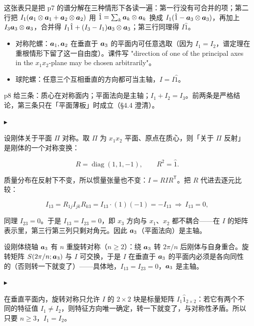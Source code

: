 \documentclass[11pt]{ctexart}
\newcommand{\step}[1]{\par\vspace{3pt}\noindent
  {\color{violet}\small$\blacktriangleright$}\hspace{3pt}{\bfseries\color{violetdeep}#1}\par\vspace{1pt}}
\begin{document}
这张表只是把 p7 的谱分解在三种情形下各读一遍：第一行没有可合并的项；第二行把 $I_1(\boldsymbol{a}_1\otimes\boldsymbol{a}_1+\boldsymbol{a}_2\otimes\boldsymbol{a}_2)$ 用 $\hat1=\sum_k\boldsymbol{a}_k\otimes\boldsymbol{a}_k$ 换成 $I_1(\hat1-\boldsymbol{a}_3\otimes\boldsymbol{a}_3)$，再加上 $I_3\boldsymbol{a}_3\otimes\boldsymbol{a}_3$，合并得 $I_1\hat1+(I_3-I_1)\boldsymbol{a}_3\otimes\boldsymbol{a}_3$；第三行同理得 $I\hat1$。

\begin{itemize}
\item 对称陀螺：$\boldsymbol{a}_1,\boldsymbol{a}_2$ 在垂直于 $\boldsymbol{a}_3$ 的平面内可任意选取（因为 $I_1=I_2$，谱定理在重根情形下留了这一自由度）。课件写 "direction of one of the principal axes in the $x_1x_2$-plane may be chosen arbitrarily"。
\item 球陀螺：任意三个互相垂直的方向都可当主轴，$I=I\hat1$。
\end{itemize}


p8 给三条：质心在对称面内；平面法向是主轴；$I_1+I_2=I_3$。前两条是严格结论，第三条只在「平面薄板」时成立（\S4.4 澄清）。

\step{证明：法向是主轴}
设刚体关于平面 $\Pi$ 对称。取 $\Pi$ 为 $x_1x_2$ 平面、原点在质心，则「关于 $\Pi$ 反射」是刚体的一个对称变换：

\[
R=\operatorname{diag}(1,1,-1),\qquad R^2=\hat1 .
\]

质量分布在反射下不变，所以惯量张量也不变：$I=RI R^{\mathsf T}$。把 $R$ 代进去逐元比较：

\[
I_{13}=R_{1j}I_{jk}R_{k3}=I_{13}\cdot(1)(-1)=-I_{13}\ \Longrightarrow\ I_{13}=0,
\]

同理 $I_{23}=0$。于是 $I_{13}=I_{23}=0$，即 $x_3$ 方向与 $x_1$、$x_2$ 都不耦合——在 $I$ 的矩阵表示里，第三行第三列只剩对角元。因此 $\boldsymbol{a}_3$（平面法向）是主轴。



设刚体绕轴 $\boldsymbol{a}_3$ 有 $n$ 重旋转对称（$n\ge2$）：绕 $\boldsymbol{a}_3$ 转 $2\pi/n$ 后刚体与自身重合。旋转矩阵 $S(2\pi/n;\boldsymbol{a}_3)$ 与 $I$ 可交换，于是 $I$ 在垂直于 $\boldsymbol{a}_3$ 的平面内必须是各向同性的（否则转一下就变了）——具体地，$I_{13}=I_{23}=0$，$\boldsymbol{a}_3$ 是主轴。

\step{为什么 $n>2$ 才有 $I_1=I_2$}
在垂直平面内，旋转对称只允许 $I$ 的 $2\times2$ 块是标量矩阵 $I_1\hat1_{2\times2}$：若它有两个不同的特征值 $I_1\neq I_2$，则特征方向唯一确定，转一下就变了，与对称性矛盾。所以只要 $n\ge3$，$I_1=I_2$。
\end{document}

